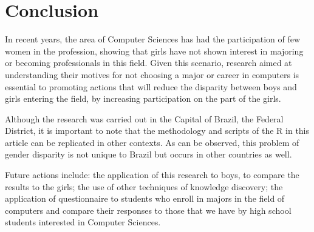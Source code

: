 \section{Conclusion}\label{sec:conclusion}%

In recent years, the area of Computer Sciences has had the participation of few women in the profession, showing that girls have not shown interest in majoring or becoming professionals in this field. Given this scenario, research aimed at understanding their motives for not choosing a major or career in computers is essential to promoting actions that will reduce the disparity between boys and girls entering the field, by increasing participation on the part of the girls. 

Although the research was carried out in the Capital of Brazil, the Federal District, it is important to note that the methodology and scripts of the R in this article can be replicated in other contexts. As can be observed, this problem of gender disparity is not unique to Brazil but occurs in other countries as well. 

Future actions include: the application of this research to boys, to compare the results to the girls; the use of other techniques of knowledge discovery; the application of questionnaire to students who enroll in majors in the field of computers and compare their responses to those that we have by high school students interested in Computer Sciences.  
